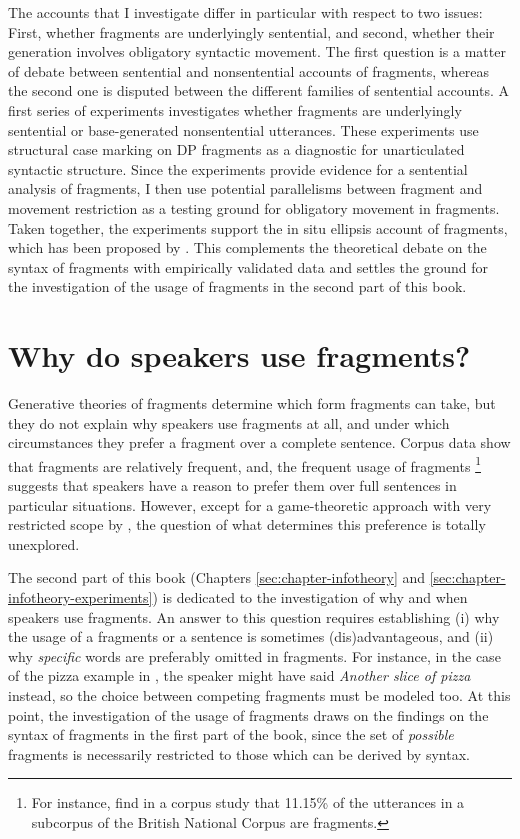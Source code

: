 The accounts that I investigate differ in particular with respect to two issues: First, whether fragments are underlyingly sentential, and second, whether their generation involves obligatory syntactic movement. The first question is a matter of debate between sentential and nonsentential accounts of fragments, whereas the second one is disputed between the different families of sentential accounts. A first series of experiments investigates whether fragments are underlyingly sentential or base-generated nonsentential utterances. These experiments use structural case marking on DP fragments as a diagnostic for unarticulated syntactic structure. Since the experiments provide evidence for a sentential analysis of fragments, I then use potential parallelisms between fragment and movement restriction as a testing ground for obligatory movement in fragments. Taken together, the experiments support the in situ ellipsis account of fragments, which has been proposed by \citet{reich2007}. This complements the theoretical debate on the syntax of fragments with empirically validated data and settles the ground for the investigation of the usage of fragments in the second part of this book.

\section{Why do speakers use fragments?}
Generative theories of fragments determine which form fragments can take, but they do not explain why speakers use fragments at all, and under which circumstances they prefer a fragment over a complete sentence. Corpus data show that fragments are relatively frequent, and, the frequent usage of fragments%
%
\footnote{For instance, \citet{fernandez.ginzburg2002} find in a corpus study that 11.15\% of the utterances in a subcorpus of the British National Corpus \citep{burnard2000} are fragments.}\afterfn%
%
suggests that speakers have a reason to prefer them over full sentences in particular situations. However, except for a game-theoretic approach with very restricted scope by \citet{bergen.goodman2015}, the question of what determines this preference is totally unexplored.

The second part of this book (Chapters \ref{sec:chapter-infotheory} and \ref{sec:chapter-infotheory-experiments}) is dedicated to the investigation of why and when speakers use fragments. An answer to this question requires establishing (i) why the usage of a fragments or a sentence is sometimes (dis)advantageous, and (ii) why \textit{specific} words are preferably omitted in fragments. For instance, in the case of the pizza example in \Last, the speaker might have said \textit{Another slice of pizza} instead, so the choice between competing fragments must be modeled too. At this point, the investigation of the usage of fragments draws on the findings on the syntax of fragments in the first part of the book, since the set of \textit{possible} fragments is necessarily restricted to those which can be derived by syntax. 

